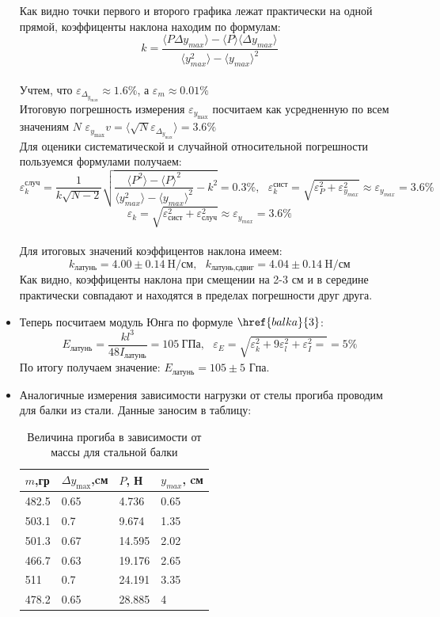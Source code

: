 \documentclass[a4paper,12pt]{article} %
\begin{document}
\begin{itemize}
Как видно точки первого и второго графика лежат практически на одной прямой, коэффиценты наклона находим по формулам:
$$k=\dfrac{\langle P \Delta y_{max} \rangle-\langle P \rangle \langle \Delta y_{max} \rangle}
{\langle y^2_{max} \rangle - \langle  y_{max} \rangle^2}$$\\
Учтем, что $\varepsilon_{\Delta_{y_{\text{max}}}} \approx 1.6 \%$, а $\varepsilon_{m} \approx 0.01 \%$\\
Итоговую погрешность измерения $\varepsilon_{y_{\text{max}}}$ посчитаем как усредненную по всем значениям $N$
$\varepsilon_{y_{\text{max}}}v= \langle \sqrt{N}\varepsilon_{\Delta_{y_{\text{max}}}} \rangle = 3.6 \% $\\
Для оценики систематической и случайной относительной погрешности пользуемся формулами получаем:
$$\varepsilon_k^\text{случ}=\frac{1}{k\sqrt{N-2}}\sqrt{\frac{\langle P^2 \rangle - \langle P \rangle^2}
{\langle y^2_{max} \rangle - \langle  y_{max} \rangle^2} - k^2} = 0.3 \%, \ \ \ 
\varepsilon_k^\text{сист}=\sqrt{\varepsilon^2_{P}+\varepsilon^2_{y_{max}}} \approx \varepsilon_{y_{max}} = 3.6 \% $$
$$\varepsilon_k=\sqrt{\varepsilon_\text{сист}^2+\varepsilon_\text{случ}^2} \approx \varepsilon_{y_{max}}= 3.6 \% $$\\
Для итоговых значений коэффицентов наклона имеем:
$$k_{\text{латунь}}=4.00 \pm 0.14 \ \text{H}/\text{см}, \ \ \
k_{\text{латунь,сдвиг}}=4.04 \pm 0.14 \ \text{H}/\text{см} $$
Как видно, коэффиценты наклона при смещении на 2-3 см и в середине практически совпадают и 
находятся в пределах погрешности друг друга.
    \item Теперь посчитаем модуль Юнга по формуле $\href{balka}{3}$:
$$E_{\text{латунь}} = \frac{k l^3}{48 I_{\text{латунь}}}=105 \ \text{ГПа}, \ \ \ 
\varepsilon_{E}=\sqrt{\varepsilon^2_{k}+9\varepsilon^2_{l}+\varepsilon^2_{I}=} = 5 \% $$
По итогу получаем значение: $E_{\text{латунь}}= 105 \pm 5$ Гпа.
    \item Аналогичные измерения зависимости нагрузки от стелы прогиба проводим для балки из стали.
Данные заносим в таблицу:

\begin{table}[!h]
    \begin{center}
    \begin{tabular}{|l|l|l|l|} \hline
    $m$,гр & $\Delta y_{\text{max}}$,cм & $P$, Н   & $y_{max}$, cм \\ \hline
    482.5   & 0.65 & 4.736   & 0.65   \\ \hline 
    503.1   & 0.7  & 9.674   & 1.35   \\ \hline
    501.3   & 0.67 & 14.595  & 2.02   \\ \hline
    466.7   & 0.63 & 19.176  & 2.65   \\ \hline
    511     & 0.7  & 24.191  & 3.35   \\ \hline
    478.2   & 0.65 & 28.885  & 4      \\ \hline
    \end{tabular}
    \caption{Величина прогиба в зависимости от массы для стальной балки}
    \end{center}
\end{table}


\end{itemize}
\end{document}
